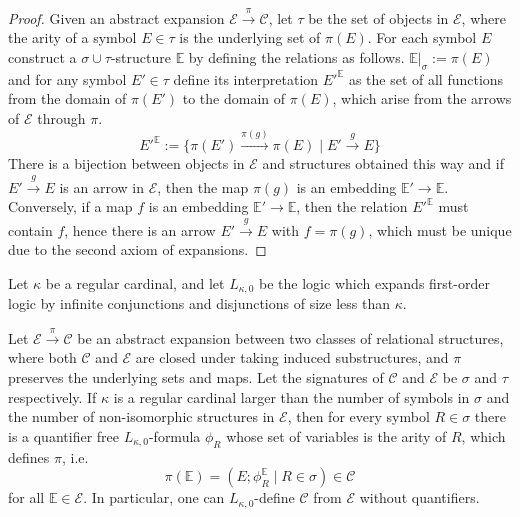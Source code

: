 \documentclass[preprint,12pt]{elsarticle}
\newcommand{\cat}[1]{\mathcal{#1}}
\newcommand{\str}[1]{\mathbb{#1}}
\begin{document}
\begin{proof}
    Given an abstract expansion $\cat E\xrightarrow{\pi}\cat C$, let $\tau$ be the set of objects in $\cat E$, where the arity of a symbol $E\in\tau$ is the underlying set of $\pi(E)$. For each symbol $E$ construct a $\sigma\cup\tau$-structure $\str E$ by defining the relations as follows. $\str E|_\sigma := \pi(E)$ and for any symbol $E'\in\tau$ define its interpretation $E'^{\str E}$ as the set of all functions from the domain of $\pi(E')$ to the domain of $\pi(E)$, which arise from the arrows of $\cat E$ through $\pi$.
    $$
    E'^{\str E} := \{\pi(E')\xrightarrow{\pi(g)}\pi(E)\mid E'\xrightarrow{g} E\}
    $$
    There is a bijection between objects in $\cat E$ and structures obtained this way and if $E'\xrightarrow{g}E$ is an arrow in $\cat E$, then the map $\pi(g)$ is an embedding $\str E'\to\str E$. Conversely, if a map $f$ is an embedding $\str E'\to\str E$, then the relation $E'^{\str E}$ must contain $f$, hence there is an  arrow $E'\xrightarrow{g} E$ with $f=\pi(g)$, which must be unique due to the second axiom of expansions.
\end{proof}


Let $\kappa$ be a regular cardinal, and let $L_{\kappa,0}$ be the logic which expands first-order logic by infinite conjunctions and disjunctions of size less than $\kappa$.


\begin{prop}
\label{prop:definability}
    Let $\cat E\xrightarrow{\pi}\cat C$ be an abstract expansion between two classes of relational structures, where both $\cat C$ and $\cat E$ are closed under taking induced substructures, and $\pi$ preserves the underlying sets and maps. Let the signatures of $\cat C$ and $\cat E$ be $\sigma$ and $\tau$ respectively. If $\kappa$ is a regular cardinal larger than the number of symbols in $\sigma$ and the number of non-isomorphic structures in $\cat E$, then for every symbol $R\in\sigma$ there is a quantifier free $L_{\kappa,0}$-formula $\phi_R$ whose set of variables is the arity of $R$, which defines $\pi$, i.e.
    $$
    \pi(\str E) = (E; \phi_R^{\str E}\mid R\in\sigma)\in\cat C
    $$
    for all $\str E\in\cat E$.
    In particular, one can $L_{\kappa,0}$-define $\cat C$ from $\cat E$ without quantifiers.
\end{prop}
\end{document}
